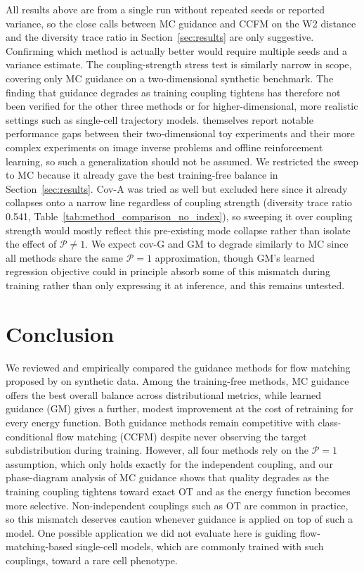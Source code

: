 \documentclass{article}
\begin{document}
All results above are from a single run without repeated seeds or reported variance, so the close calls between MC guidance and CCFM on the W2 distance and the diversity trace ratio in Section~\ref{sec:results} are only suggestive.
Confirming which method is actually better would require multiple seeds and a variance estimate.
The coupling-strength stress test is similarly narrow in scope, covering only MC guidance on a two-dimensional synthetic benchmark.
The finding that guidance degrades as training coupling tightens has therefore not been verified for the other three methods or for higher-dimensional, more realistic settings such as single-cell trajectory models.
\citet{feng25s_guidance} themselves report notable performance gaps between their two-dimensional toy experiments and their more complex experiments on image inverse problems and offline reinforcement learning, so such a generalization should not be assumed.
We restricted the sweep to MC because it already gave the best training-free balance in Section~\ref{sec:results}.
Cov-A was tried as well but excluded here since it already collapses onto a narrow line regardless of coupling strength (diversity trace ratio 0.541, Table~\ref{tab:method_comparison_no_index}), so sweeping it over coupling strength would mostly reflect this pre-existing mode collapse rather than isolate the effect of $\mathcal{P} \neq 1$.
We expect cov-G and GM to degrade similarly to MC since all methods share the same $\mathcal{P}=1$ approximation, though GM's learned regression objective could in principle absorb some of this mismatch during training rather than only expressing it at inference, and this remains untested.

\section{Conclusion}
\label{Conclusion}

We reviewed and empirically compared the guidance methods for flow matching proposed by \citet{feng25s_guidance} on synthetic data.
Among the training-free methods, MC guidance offers the best overall balance across distributional metrics, while learned guidance (GM) gives a further, modest improvement at the cost of retraining for every energy function.
Both guidance methods remain competitive with class-conditional flow matching (CCFM) despite never observing the target subdistribution during training.
However, all four methods rely on the $\mathcal{P}=1$ assumption, which only holds exactly for the independent coupling, and our phase-diagram analysis of MC guidance shows that quality degrades as the training coupling tightens toward exact OT and as the energy function becomes more selective.
Non-independent couplings such as OT are common in practice, so this mismatch deserves caution whenever guidance is applied on top of such a model.
One possible application we did not evaluate here is guiding flow-matching-based single-cell models, which are commonly trained with such couplings, toward a rare cell phenotype.
\end{document}

